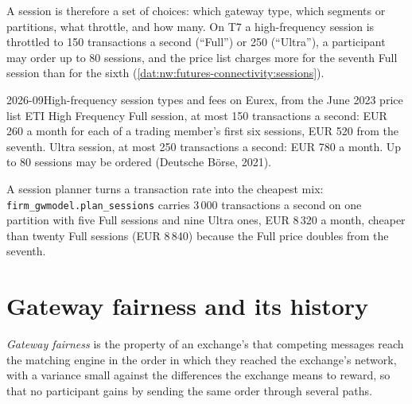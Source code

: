 A session is therefore a set of choices: which gateway type, which segments or partitions, what throttle, and how many. On
T7 a high-frequency session is throttled to 150 transactions a second (``Full'') or 250 (``Ultra''), a participant may order up
to 80 sessions, and the price list charges more for the seventh Full session than for the sixth
(\cref{dat:nw:futures-connectivity:sessions}).

\begin{dated}{2026-09}{High-frequency session types and fees on Eurex, from the June 2023 price list}\label{dat:nw:futures-connectivity:sessions}
ETI High Frequency Full session, at most 150 transactions a second: EUR 260 a month for each of a trading member's first six
sessions, EUR 520 from the seventh. Ultra session, at most 250 transactions a second: EUR 780 a month. Up to 80 sessions may be
ordered (Deutsche Börse, 2021).
\end{dated}

A session planner turns a transaction rate into the cheapest mix: \texttt{firm\_gwmodel.plan\_sessions} carries 3\,000
transactions a second on one partition with five Full sessions and nine Ultra ones, EUR 8\,320 a month, cheaper than twenty
Full sessions (EUR 8\,840) because the Full price doubles from the seventh.

\section{Gateway fairness and its history}

\begin{definition}\label{def:nw:futures-connectivity:fairness}
\emph{Gateway fairness} is the property of an exchange's  that competing messages reach
the matching engine in the order in which they reached the exchange's network, with a variance small against the differences
the exchange means to reward, so that no participant gains by sending the same order through several paths.
\end{definition}

